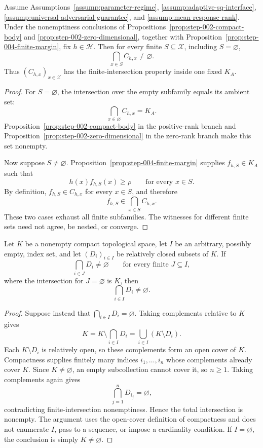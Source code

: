 \begin{proposition}
\label{prop:step-005-finite-intersections}
Assume Assumptions~\ref{assump:parameter-regime},
\ref{assump:adaptive-sq-interface},
\ref{assump:universal-adversarial-guarantee}, and
\ref{assump:mean-response-rank}.  Under the nonemptiness conclusions of
Propositions~\ref{prop:step-002-compact-body} and
\ref{prop:step-002-zero-dimensional}, together with
Proposition~\ref{prop:step-004-finite-margin}, fix \(h\in\mathcal H\).  Then
for every finite \(S\subseteq\mathcal X\), including \(S=\varnothing\),
\[
\bigcap_{x\in S}C_{h,x}\ne\varnothing.
\]
Thus \((C_{h,x})_{x\in\mathcal X}\) has the finite-intersection property
inside one fixed \(K_A\).
\end{proposition}

\begin{proof}
For \(S=\varnothing\), the intersection over the empty subfamily equals its
ambient set:
\[
\bigcap_{x\in\varnothing}C_{h,x}=K_A.
\]
Proposition~\ref{prop:step-002-compact-body} in the positive-rank branch and
Proposition~\ref{prop:step-002-zero-dimensional} in the zero-rank branch make
this set nonempty.

Now suppose \(S\ne\varnothing\).  Proposition~\ref{prop:step-004-finite-margin}
supplies \(f_{h,S}\in K_A\) such that
\[
h(x)f_{h,S}(x)\ge\rho
\qquad\text{for every }x\in S.
\]
By definition, \(f_{h,S}\in C_{h,x}\) for every \(x\in S\), and therefore
\[
f_{h,S}\in\bigcap_{x\in S}C_{h,x}.
\]
These two cases exhaust all finite subfamilies.  The witnesses for different
finite sets need not agree, be nested, or converge.
\end{proof}

\begin{lemma}
\label{lem:step-005-compact-fip}
Let \(K\) be a nonempty compact topological space, let \(I\) be an arbitrary,
possibly empty, index set, and let \((D_i)_{i\in I}\) be relatively closed
subsets of \(K\).  If
\[
\bigcap_{i\in J}D_i\ne\varnothing
\qquad\text{for every finite }J\subseteq I,
\]
where the intersection for \(J=\varnothing\) is \(K\), then
\[
\bigcap_{i\in I}D_i\ne\varnothing.
\]
\end{lemma}

\begin{proof}
Suppose instead that \(\bigcap_{i\in I}D_i=\varnothing\).  Taking
complements relative to \(K\) gives
\[
K=K\setminus\bigcap_{i\in I}D_i
=\bigcup_{i\in I}(K\setminus D_i).
\]
Each \(K\setminus D_i\) is relatively open, so these complements form an
open cover of \(K\).  Compactness supplies finitely many indices
\(i_1,\ldots,i_n\) whose complements already cover \(K\).  Since
\(K\ne\varnothing\), an empty subcollection cannot cover it, so \(n\ge1\).
Taking complements again gives
\[
\bigcap_{j=1}^nD_{i_j}=\varnothing,
\]
contradicting finite-intersection nonemptiness.  Hence the total intersection
is nonempty.  The argument uses the open-cover definition of compactness and
does not enumerate \(I\), pass to a sequence, or impose a cardinality
condition.  If \(I=\varnothing\), the conclusion is simply
\(K\ne\varnothing\).
\end{proof}

